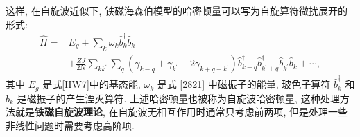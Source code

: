 这样, 在自旋波近似下, 铁磁海森伯模型的哈密顿量可以写为自旋算符微扰展开的形式:
\begin{align}
\hat{H}=& E_{g}+\sum_{k} \omega_{k} \hat{b}_{k}^{\dagger} \hat{b}^{}_{k} \nonumber\\
&+\frac{Z J}{2 N} \sum_{k k^{\prime}} \sum_{q}\left(\gamma_{k-q}+\gamma_{k^{\prime}}-2 \gamma_{k+q-k^{\prime}}\right) \hat{b}_{k-q}^{\dagger} \hat{b}^{\dagger}_{k^{\prime}+q} \hat{b}^{}_{k^{\prime}} \hat{b}^{}_{k}+\cdots,
\end{align}
其中 $E_{g}$ 是式\eqref{HW7}中的基态能, $\omega_{k}$ 是式 \eqref{2821} 中磁振子的能量, 玻色子算符 $\hat{b}_{k}^{\dagger}$ 和 $\hat{b}^{}_{k}$ 是磁振子的产生湮灭算符. 上述哈密顿量也被称为自旋波哈密顿量, 这种处理方法就是\textbf{铁磁自旋波理论}, 在自旋波无相互作用时通常只考虑前两项, 但是处理一些非线性问题时需要考虑高阶项.

